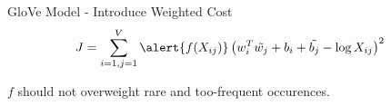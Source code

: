 \begin{frame}{GloVe Model - Introduce Weighted Cost}
  \begin{align*}
    & J = \sum_{i=1,j=1}^V \alert{f(X_{ij})} \left( w_i^T\tilde{w_j} +b_i + \tilde{b_j} - \log X_{ij} \right)^2
  \end{align*}
  \begin{center}
      $f$ should not overweight rare and too-frequent occurences.
  \end{center}
\end{frame}


